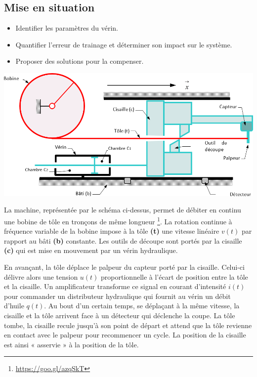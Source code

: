 \documentclass[10pt,fleqn]{article} %
\begin{document}
\def\pathfig{images}

\vspace{6cm}
\pagestyle{fancy}
\thispagestyle{plain}

\def\columnseprulecolor{\color{ocre}}
\setlength{\columnseprule}{0.4pt} 

\def\pathfig{images}

\begin{multicols}{2}
\section*{Mise en situation}
\ifprof
\else
\begin{obj}
\begin{itemize}
\item Identifier les paramètres du vérin.
\item Quantifier l'erreur de trainage et déterminer son impact sur le système.
\item Proposer des solutions pour la compenser.
\end{itemize}
\end{obj}
\begin{center}
\includegraphics[width=\linewidth]{images/fig_01}
\end{center}

La machine, représentée par le schéma ci-dessus, permet de débiter en continu une bobine de tôle en tronçons de même longueur \footnote{
\url{https://goo.gl/azqSkT}}. La rotation continue à fréquence variable de la bobine impose à la tôle \textbf{(t)} une vitesse linéaire $v(t)$ par rapport au bâti \textbf{(b)} constante.
Les outils de découpe sont portés par la cisaille \textbf{(c)} qui est mise en mouvement par un vérin hydraulique.

En avançant, la tôle déplace le palpeur du capteur porté par la cisaille. Celui-ci délivre alors une tension $u(t)$ proportionnelle à l'écart de position entre la tôle et la cisaille. Un amplificateur transforme ce signal en courant d'intensité $i(t)$ pour commander un distributeur hydraulique qui fournit au vérin un débit d'huile $q(t)$. Au bout d'un certain temps, se déplaçant à la même vitesse, la cisaille et la tôle arrivent face à un détecteur qui déclenche la coupe. La tôle tombe, la cisaille recule jusqu'à son point de départ et attend que la tôle revienne en contact avec le palpeur pour recommencer un cycle. La position de la cisaille est ainsi « asservie » à la position de la tôle.


\end{multicols}
\end{document}
